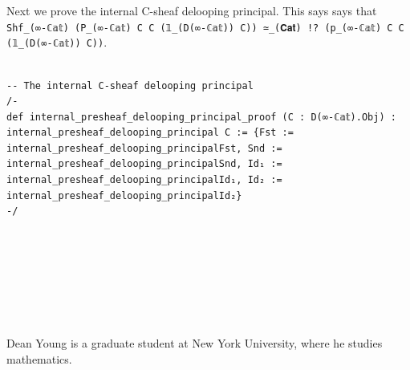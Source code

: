 \documentclass{book}
\theoremstyle{definition}
\newcounter{lcounter}
\begin{document}
{\begin{center}
\begin{tcolorbox}[width=5in,colback={white},title={\begin{center}\texttt{Lean \thelcounter} \addtocounter{lcounter}{1}  \end{center}},colbacktitle=Yellow,coltitle=black]
\begin{verbatim}
\end{verbatim}
\end{tcolorbox}
\end{center}

Next we prove the internal C-sheaf delooping principal. This says says that \texttt{Shf\_(∞-ℂ𝕒𝕥) (P\_(∞-ℂ𝕒𝕥) C C (𝟙\_(D(∞-ℂ𝕒𝕥)) C)) ≃\_(𝐂𝐚𝐭) !? (p\_(∞-ℂ𝕒𝕥) C C (𝟙\_(D(∞-ℂ𝕒𝕥)) C))}.\\

\begin{center}
\begin{tcolorbox}[width=5in,colback={white},title={\begin{center}\texttt{Lean \thelcounter} \addtocounter{lcounter}{1}  \end{center}},colbacktitle=Yellow,coltitle=black]
\begin{verbatim}

-- The internal C-sheaf delooping principal
/-
def internal_presheaf_delooping_principal_proof (C : D(∞-ℂ𝕒𝕥).Obj) : internal_presheaf_delooping_principal C := {Fst := internal_presheaf_delooping_principalFst, Snd := internal_presheaf_delooping_principalSnd, Id₁ := internal_presheaf_delooping_principalId₁, Id₂ := internal_presheaf_delooping_principalId₂}
-/

\end{verbatim}
\end{tcolorbox}
\end{center}
\fi




\newpage 
\ \\
\ \\
\ \\
\ \\
\ \\
\ \\
\begin{center}
\begin{tcolorbox}[width=5in,colback={white},title={\begin{center}\texttt{About the Author} \addtocounter{lcounter}{1}  \end{center}},colbacktitle=Yellow,coltitle=black]
Dean Young is a graduate student at New York University, where he studies mathematics. \\


\end{tcolorbox}
\end{center}}
\end{document}
